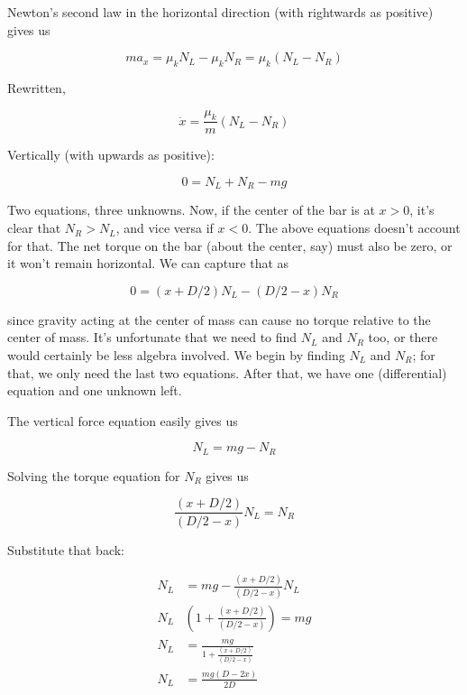 \documentclass[8.01x]{subfiles}
\begin{document}
Newton's second law in the horizontal direction (with rightwards as positive) gives us

\begin{equation}
m a_x = \mu_k N_L - \mu_k N_R = \mu_k (N_L - N_R)
\end{equation}

Rewritten,

\begin{equation}
\ddot{x} = \frac{\mu_k}{m} (N_L - N_R)
\end{equation}

Vertically (with upwards as positive):

\begin{equation}
0 = N_L + N_R - m g
\end{equation}

Two equations, three unknowns. Now, if the center of the bar is at $x>0$, it's clear that $N_R > N_L$, and vice versa if $x < 0$. The above equations doesn't account for that. The net torque on the bar (about the center, say) must also be zero, or it won't remain horizontal. We can capture that as

\begin{equation}
0 = (x + D/2) N_L - (D/2 - x) N_R
\end{equation}

since gravity acting at the center of mass can cause no torque relative to the center of mass. It's unfortunate that we need to find $N_L$ and $N_R$ too, or there would certainly be less algebra involved.  We begin by finding $N_L$ and $N_R$; for that, we only need the last two equations. After that, we have one (differential) equation and one unknown left.

The vertical force equation easily gives us

\begin{equation}
N_L = m g - N_R
\end{equation}

Solving the torque equation for $N_R$ gives us

\begin{equation}
\frac{(x + D/2)}{(D/2 - x)} N_L =  N_R
\end{equation}

Substitute that back:

\begin{align}
N_L &= m g - \frac{(x + D/2)}{(D/2 - x)} N_L\\
N_L &\left(1 + \frac{(x + D/2)}{(D/2 - x)}\right) = m g\\
N_L &= \frac{m g}{1 + \frac{(x + D/2)}{(D/2 - x)}}\\
N_L &= \frac{m g(D - 2x)}{2D}
\end{align}
\end{document}
